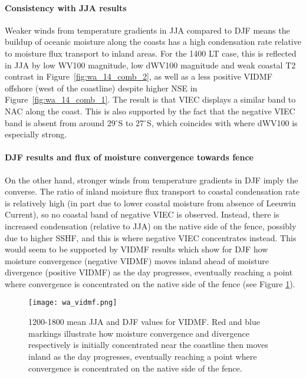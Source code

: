 \paragraph{Consistency with JJA results}

Weaker winds from temperature gradients in \ac{JJA} compared to \ac{DJF} means the buildup of oceanic moisture along the coasts has a high condensation rate relative to moisture flux transport to inland areas. For the 1400 \ac{LT} case, this is reflected in \ac{JJA} by low \ac{WV100} magnitude, low \ac{dWV100} magnitude and weak coastal \ac{T2} contrast in Figure~\ref{fig:wa_14_comb_2}, as well as a less positive \ac{VIDMF} offshore (west of the coastline) despite higher \ac{NSE} in Figure~\ref{fig:wa_14_comb_1}. The result is that \ac{VIEC} displays a similar band to \ac{NAC} along the coast. This is also supported by the fact that the negative \ac{VIEC} band is absent from around 29$^\circ$S to 27$^\circ$S, which coincides with where \ac{dWV100} is especially strong.

\paragraph{DJF results and flux of moisture convergence towards fence}

On the other hand, stronger winds from temperature gradients in \ac{DJF} imply the converse. The ratio of inland moisture flux transport to coastal condensation rate is relatively high (in part due to lower coastal moisture from absence of Leeuwin Current), so no coastal band of negative \ac{VIEC} is observed. Instead, there is increased condensation (relative to \ac{JJA}) on the native side of the fence, possibly due to higher \ac{SSHF}, and this is where negative \ac{VIEC} concentrates instead. This would seem to be supported by \ac{VIDMF} results which show for \ac{DJF} how moisture convergence (negative \ac{VIDMF}) moves inland ahead of moisture divergence (positive \ac{VIDMF}) as the day progresses, eventually reaching a point where convergence is concentrated on the native side of the fence (see Figure \ref{fig:wa_vidmf}).

\begin{figure}[!htp]
	\centering
	\texttt{[image: wa\_vidmf.png]}
	\caption[1200-1800 means for VIDMF]{1200-1800 mean \acs{JJA} and \acs{DJF} values for \acs{VIDMF}. Red and blue markings illustrate how moisture convergence and divergence respectively is initially concentrated near the coastline then moves inland as the day progresses, eventually reaching a point where convergence is concentrated on the native side of the fence.}
	\label{fig:wa_vidmf}
\end{figure}

